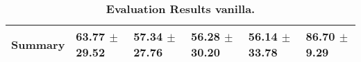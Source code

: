 \begin{table}[htb]
{\begin{tabular}{llllll}
\midrule
\textbf{Summary                                  } &                  \phantom{0}63.77 $\pm$ 29.52 &                      \phantom{0}57.34 $\pm$ 27.76 &                  \phantom{0}56.28 $\pm$ 30.20 &                  \phantom{0}56.14 $\pm$ 33.78 &  \phantom{0}86.70 $\pm$ \phantom{0}9.29 \\
\bottomrule
\end{tabular}%
}
\caption{\textbf{Evaluation Results vanilla.}}
\label{tab:eval-results}
\end{table}


